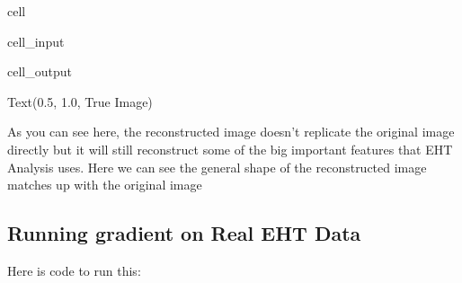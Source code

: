 \documentclass[letterpaper,10pt,english]{jupyterBook}
\begin{document}
\begin{sphinxuseclass}{cell}\begin{sphinxVerbatimInput}

\begin{sphinxuseclass}{cell_input}
\begin{sphinxVerbatim}[commandchars=\\\{\}]
  
\end{sphinxVerbatim}

\end{sphinxuseclass}\end{sphinxVerbatimInput}
\begin{sphinxVerbatimOutput}

\begin{sphinxuseclass}{cell_output}
\begin{sphinxVerbatim}[commandchars=\\\{\}]
Text(0.5, 1.0, \PYGZsq{}True Image\PYGZsq{})
\end{sphinxVerbatim}

\noindent{}

\end{sphinxuseclass}\end{sphinxVerbatimOutput}

\end{sphinxuseclass}
\sphinxAtStartPar
As you can see here, the reconstructed image doesn’t replicate the original image directly but it will still reconstruct some of the big important features that EHT Analysis uses. Here we can see the general shape of the reconstructed image matches up with the original image


\subsection{Running gradient on Real EHT Data}
\label{\detokenize{finite_gradient:running-gradient-on-real-eht-data}}
\sphinxAtStartPar
Here is code to run this:
\end{document}
